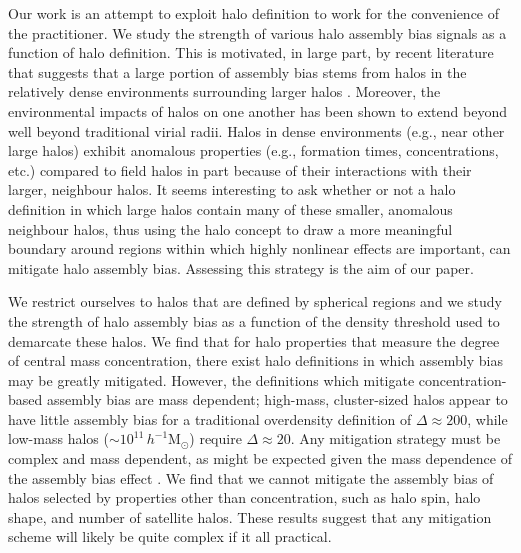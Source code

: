 \documentclass[usenatbib,fleqn]{mnras}
\begin{document}
Our work is an attempt to exploit halo definition to work for the 
convenience of the practitioner. We study the strength of various halo assembly bias signals as a function of halo definition. This is motivated, in large part, by recent literature that suggests 
that a large portion of assembly bias stems from halos in the relatively dense environments surrounding larger halos \citep{wang_etal07, warnick_etal08, more_etal15,sunayama_etal16}. Moreover, 
the environmental impacts of halos on one another has been shown to extend beyond well beyond traditional virial radii. 
\citep{wetzel_etal14, diemer_kravtsov14, adhikari_etal14, wetzel_nagai15, more_etal15}  Halos in dense environments (e.g., near other large halos) exhibit anomalous properties 
(e.g., formation times, concentrations, etc.) compared to field halos 
in part because of their interactions with their larger, neighbour halos. It seems interesting to ask 
whether or not a halo definition in which large halos contain many of these smaller, anomalous neighbour halos, thus 
using the halo concept to draw a more meaningful boundary around regions within which highly nonlinear effects are important, can mitigate halo assembly bias. Assessing this strategy is the aim of our paper. 


We restrict ourselves to halos that are defined by spherical regions and we study the strength of halo assembly bias as a function of the density threshold used to demarcate these halos. We find that for halo properties that measure the degree of central mass concentration, there exist halo definitions in which assembly bias may be 
greatly mitigated. However, the definitions which mitigate concentration-based assembly bias are mass dependent; high-mass, cluster-sized halos appear to have little assembly bias 
for a traditional overdensity definition of $\Delta \approx 200$, 
while low-mass halos ($\sim 10^{11}\, h^{-1}\mathrm{M}_{\odot}$) require 
$\Delta \approx 20$. Any mitigation strategy must be complex and mass dependent, as might be expected given the mass dependence of the assembly bias effect \citep{wechsler_etal06}. 
We find that we cannot mitigate the assembly bias of halos selected by properties other than concentration, such as halo spin, halo shape, and number of satellite halos. These results suggest that any mitigation scheme will likely be quite complex if it all practical. 
\end{document}
